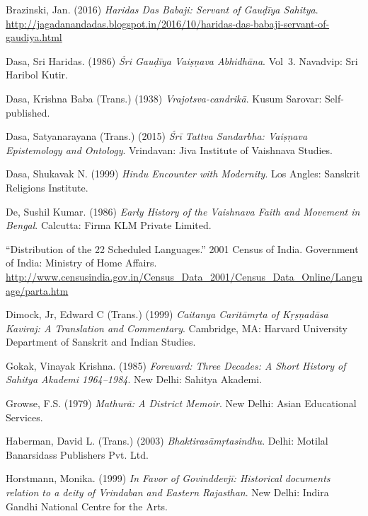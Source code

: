 \begin{thebibliography}{99}
\itemsep=2pt
Brazinski, Jan. (2016) {\sl Haridas Das Babaji: Servant of Gauḍīya Sahitya}. 
\url{http://jagadanandadas.blogspot.in/2016/10/haridas-das-babaji-servant-of-gaudiya.html} 

Dasa, Sri Haridas. (1986) {\sl Śri Gauḍīya Vaiṣṇava Abhidhāna}. Vol~3. Navadvip: Sri Haribol Kutir. 

Dasa, Krishna Baba (Trans.) (1938) {\sl Vrajotsva-candrikā}. Kusum Sarovar: Self-published. 

Dasa, Satyanarayana (Trans.) (2015) {\sl Śrī Tattva Sandarbha: Vaiṣṇava Epistemology and Ontology}. Vrindavan: Jiva Institute of Vaishnava Studies. 

Dasa, Shukavak N. (1999) {\sl Hindu Encounter with Modernity}. Los Angles: Sanskrit Religions Institute. 

De, Sushil Kumar. (1986) {\sl Early History of the Vaishnava Faith and Movement in Bengal}. Calcutta: Firma KLM Private Limited. 

“Distribution of the 22 Scheduled Languages.” 2001 Census of India. Government of India: Ministry of Home Affairs. 
\url{http://www.censusindia.gov.in/Census_Data_2001/Census_Data_Online/Language/parta.htm}

Dimock, Jr, Edward C (Trans.) (1999) {\sl Caitanya Caritāmṛta of Kṛṣṇadāsa Kaviraj: A Translation and Commentary}. Cambridge, MA: Harvard University Department of Sanskrit and Indian Studies. 

Gokak, Vinayak Krishna. (1985) {\sl Foreward: Three Decades: A Short History of Sahitya Akademi 1964--1984}. New Delhi: Sahitya Akademi. 

Growse, F.S. (1979) {\sl Mathurā: A District Memoir}. New Delhi: Asian Educational Services. 

Haberman, David L. (Trans.) (2003) {\sl Bhaktirasāmṛtasindhu}. Delhi: Motilal Banarsidass Publishers Pvt. Ltd. 

Horstmann, Monika. (1999) {\sl In Favor of Govinddevjī: Historical documents relation to a deity of Vrindaban and Eastern Rajasthan}. New Delhi: Indira Gandhi National Centre for the Arts. 


\end{thebibliography}
